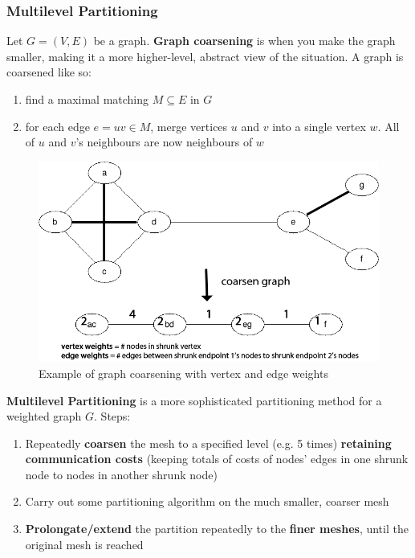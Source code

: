 \documentclass{article}
\begin{document}
\subsubsection{Multilevel Partitioning}

Let $G = (V, E)$ be a graph. \textbf{Graph coarsening} is when you make the graph smaller, making it a more higher-level, abstract view of the situation. A graph is coarsened like so:
\begin{enumerate}
	\item find a maximal matching $M \subseteq E$ in $G$
	\item for each edge $e = uv \in M$, merge vertices $u$ and $v$ into a single vertex $w$. All of $u$ and $v$'s neighbours are now neighbours of $w$
\end{enumerate}

\begin{figure}[H]
	\centering
	\includegraphics[scale=0.35]{figures/graph-coarsen-example.png}
	\caption{Example of graph coarsening with vertex and edge weights}
	\label{fig:graph-coarsen-example}
\end{figure}

\textbf{Multilevel Partitioning} is a more sophisticated partitioning method for a weighted graph $G$. Steps:
\begin{enumerate}
	\item Repeatedly \textbf{coarsen} the mesh to a specified level (e.g. 5 times) \textbf{retaining communication costs} (keeping totals of costs of nodes' edges in one shrunk node to nodes in another shrunk node)
	\item Carry out some partitioning algorithm on the much smaller, coarser mesh
	\item \textbf{Prolongate/extend} the partition repeatedly to the \textbf{finer meshes}, until the original mesh is reached
\end{enumerate}
\end{document}
